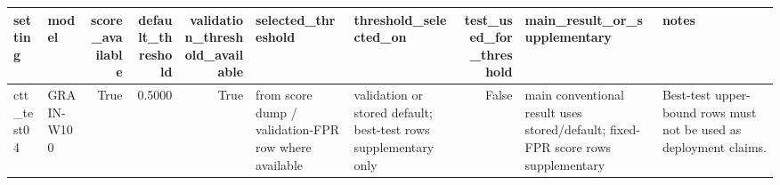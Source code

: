\begin{tabular}{llrrrllrll}
\toprule
setting & model & score\_available & default\_threshold & validation\_threshold\_available & selected\_threshold & threshold\_selected\_on & test\_used\_for\_threshold & main\_result\_or\_supplementary & notes \\
\midrule
ctt\_test04 & GRAIN-W100 & True & 0.5000 & True & from score dump / validation-FPR row where available & validation or stored default; best-test rows supplementary only & False & main conventional result uses stored/default; fixed-FPR score rows supplementary & Best-test upper-bound rows must not be used as deployment claims. \\
\bottomrule
\end{tabular}
